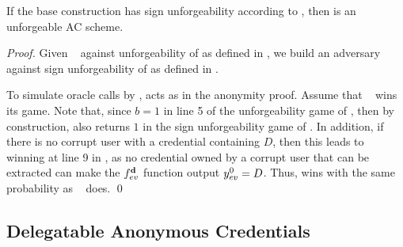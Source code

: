 \begin{theorem}
  \label{thm:forge-cuasac}
  If the base \CUASGen construction has sign unforgeability according to
  , then \CUASAC is an unforgeable AC scheme.
\end{theorem}

\begin{proof}
  Given \adv~ against unforgeability of \CUASAC as defined in \cite{fhs19}, we
  build an adversary \advB against sign unforgeability of \CUASGen as defined in
  .

  To simulate oracle calls by \adv, \advB acts as in the anonymity proof. Assume
  that \adv~ wins its game. Note that, since $b=1$ in line 5 of the
  unforgeability game of , then by construction, \Verify
  also returns $1$ in the sign unforgeability game of \UAS. In addition, if
  there is no corrupt user with a credential containing $D$, then this leads to
  \advB winning at line 9 in , as no credential
  owned by a corrupt user that can be extracted can make the $f_{ev}^{\mathbf{d}}$
  function output $y_{ev}^0=D$. Thus, \advB wins with the same probability as
  \adv~ does.  
  \qed
\end{proof}

\subsection{Delegatable Anonymous Credentials}
\label{sapp:related-models-dac}

